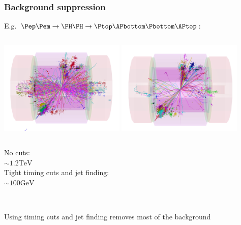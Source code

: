\documentclass{beamer}
\begin{document}
\begin{frame}
\frametitle{Background suppression}
E.g. $\Pep\Pem\to\PH\PH\to\Ptop\APbottom\Pbottom\APtop$:
\begin{columns}[c]
\column{6cm}
\centering
\includegraphics[width=6cm]{HH2.pdf}
\column{6cm}
\centering
\includegraphics[width=6cm]{HH2tight.pdf}
\end{columns}
\begin{columns}[c]
\column{6cm}
\centering
No cuts:\\ \alert{$\sim1.2\textrm{TeV}$}\\
{\color{blue}{\scriptsize 10ns window}}
\column{6cm}
\centering
Tight timing cuts and jet finding:\\ \alert{$\sim100\textrm{GeV}$}
\end{columns}
~\\
\alert{Using timing cuts and jet finding removes most of the background}
\end{frame}
\end{document}
